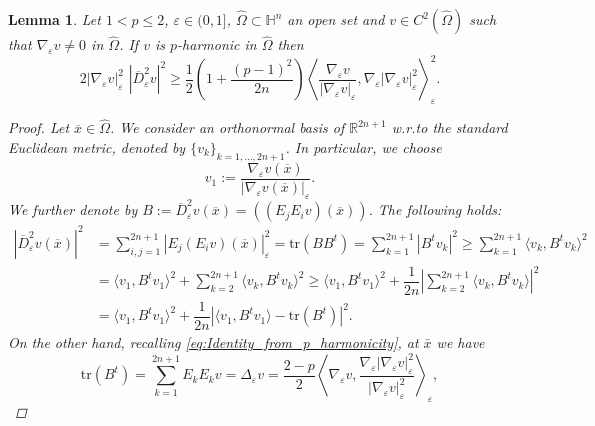 \documentclass[10pt]{amsart}
\numberwithin{equation}{section}
\newtheorem{lemma}[theorem]{Lemma}
\theoremstyle{definition}
\newcommand{\He}{\mathbb{H}}
\begin{document}
\begin{lemma}\label{lem:Kato_Improved}
	Let $1<p\leq 2$, $\varepsilon \in (0, 1]$, $\widehat{\Omega} \subset \He^n$ an open set and $v\in C^2(\widehat{\Omega})$ such that $\nabla_\varepsilon v \neq 0$ in $\widehat{\Omega}$. If $v$ is $p$-harmonic in $\widehat{\Omega}$ then
	\begin{equation}\label{eq:Kato_Improved}
		2 |\nabla_{\varepsilon}v|_{\varepsilon}^2 \, \, |\overline{D}^2_{\varepsilon}v|^2 \geq \dfrac{1}{2}\left(1+\dfrac{(p-1)^2}{2n}\right)\left\langle \dfrac{\nabla_{\varepsilon}v}{|\nabla_{\varepsilon}v|_{\varepsilon}}, \nabla_{\varepsilon}|\nabla_{\varepsilon}v|_{\varepsilon}^2\right\rangle_{\varepsilon}^2.
	\end{equation}
	\begin{proof}
		Let $\overline{x}\in \hat{\Omega}$. We consider an orthonormal basis of $\mathbb{R}^{2n+1}$ w.r.to the standard Euclidean metric, denoted by $\{v_k\}_{k=1,\ldots,2n+1}$. In particular, we choose
		\begin{equation*}
			v_1 := \dfrac{\nabla_{\varepsilon}v(\overline{x})}{|\nabla_{\varepsilon}v(\overline{x})|_{\varepsilon}}.
		\end{equation*}	
		We further denote by $B:= \overline{D}^{2}_{\varepsilon}v(\overline{x}) = \left((E_jE_i v)(\overline{x})\right)$.
		The following holds:
		\begin{equation}\label{eq:Hessian1}
			\begin{aligned}
				|\overline{D}^{2}_{\varepsilon}v(\overline{x})|^2 &= \sum_{i,j=1}^{2n+1}|E_j(E_i v)(\overline{x})|_{\varepsilon}^2 = \mathrm{tr}(BB^t) = \sum_{k=1}^{2n+1}|B^{t}v_k|^{2} \geq \sum_{k=1}^{2n+1}\langle v_k, B^{t}v_k\rangle^2 \\
				&= \langle v_1, B^{t}v_1 \rangle^2 + \sum_{k=2}^{2n+1}\langle v_k, B^{t}v_k\rangle^2 \geq \langle v_1, B^{t}v_1 \rangle^2 + \dfrac{1}{2n}\left|\sum_{k=2}^{2n+1}\langle v_k, B^{t}v_k\rangle \right|^2\\
				&= \langle v_1, B^{t}v_1 \rangle^2 + \dfrac{1}{2n}|\langle v_1,B^{t}v_1 \rangle - \mathrm{tr}(B^{t})|^{2}.
			\end{aligned}
		\end{equation}
		On the other hand, recalling \eqref{eq:Identity_from_p_harmonicity}, at $\bar{x}$ we have
		\begin{equation}\label{eq:trace_Bt}
			\mathrm{tr}(B^{t}) = \sum_{k=1}^{2n+1}E_k E_k v = \Delta_{\varepsilon}v = \dfrac{2-p}{2} \left\langle \nabla_{\varepsilon}v, \dfrac{\nabla_{\varepsilon}|\nabla_{\varepsilon}v|_{\varepsilon}^2}{|\nabla_{\varepsilon}v|_{\varepsilon}^2}\right\rangle_{\varepsilon},

\end{equation}
\end{proof}
\end{lemma}
\end{document}

